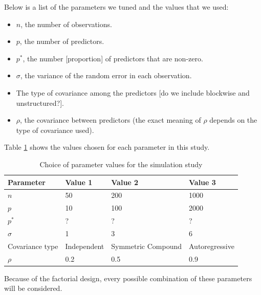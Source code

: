 \documentclass{article}
\begin{document}
Below is a list of the parameters we tuned and the values that we used:
\begin{itemize}
	\item $n$, the number of observations.
	\item $p$, the number of predictors.
	\item $p^\ast$, the number [proportion] of predictors that are non-zero.
	\item $\sigma$, the variance of the random error in each observation.
	\item The type of covariance among the predictors [do we include blockwise and unstructured?].
	\item $\rho$, the covariance between predictors (the exact meaning of $\rho$ depends on the type of covariance used).
\end{itemize}

Table \ref{tab:simulation-parameters} shows the values chosen for each parameter in this study.
\begin{table}[h]
	\caption{Choice of parameter values for the simulation study}
	\label{tab:simulation-parameters}
	\begin{tabular}{l|lll}
		Parameter       & Value 1     & Value 2            & Value 3        \\ \hline
		$n$             & 50          & 200                & 1000           \\
		$p$             & 10          & 100                & 2000           \\
		$p^\ast$        & ?           & ?                  & ?              \\
		$\sigma$        & 1           & 3                  & 6              \\
		Covariance type & Independent & Symmetric Compound & Autoregressive \\
		$\rho$          & 0.2         & 0.5                & 0.9           
	\end{tabular}
\end{table}

Because of the factorial design, every possible combination of these parameters will be considered.
\end{document}
